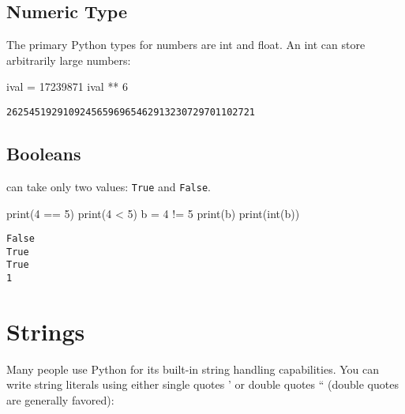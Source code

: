 \documentclass[
  letterpaper,
  DIV=11,
  numbers=noendperiod]{scrreprt}
\newenvironment{Shaded}{\begin{snugshade}}{\end{snugshade}}
\newcommand{\BuiltInTok}[1]{\textcolor[rgb]{0.00,0.23,0.31}{#1}}
\newcommand{\DecValTok}[1]{\textcolor[rgb]{0.68,0.00,0.00}{#1}}
\newcommand{\NormalTok}[1]{\textcolor[rgb]{0.00,0.23,0.31}{#1}}
\newcommand{\OperatorTok}[1]{\textcolor[rgb]{0.37,0.37,0.37}{#1}}
\begin{document}
\hypertarget{numeric-type}{%
\subsection{Numeric Type}\label{numeric-type}}

The primary Python types for numbers are int and float. An int can store
arbitrarily large numbers:

\begin{Shaded}
\begin{Highlighting}[]
\NormalTok{ival }\OperatorTok{=} \DecValTok{17239871}
\NormalTok{ival }\OperatorTok{**} \DecValTok{6}
\end{Highlighting}
\end{Shaded}

\begin{verbatim}
26254519291092456596965462913230729701102721
\end{verbatim}

\hypertarget{booleans}{%
\subsection{Booleans}\label{booleans}}

can take only two values: \texttt{True} and \texttt{False}.

\begin{Shaded}
\begin{Highlighting}[]
\BuiltInTok{print}\NormalTok{(}\DecValTok{4} \OperatorTok{==} \DecValTok{5}\NormalTok{)}
\BuiltInTok{print}\NormalTok{(}\DecValTok{4} \OperatorTok{\textless{}} \DecValTok{5}\NormalTok{)}
\NormalTok{b }\OperatorTok{=} \DecValTok{4} \OperatorTok{!=} \DecValTok{5}
\BuiltInTok{print}\NormalTok{(b)}
\BuiltInTok{print}\NormalTok{(}\BuiltInTok{int}\NormalTok{(b))}
\end{Highlighting}
\end{Shaded}

\begin{verbatim}
False
True
True
1
\end{verbatim}

\hypertarget{strings}{%
\section{Strings}\label{strings}}

Many people use Python for its built-in string handling capabilities.
You can write string literals using either single quotes ' or double
quotes `` (double quotes are generally favored):
\end{document}
